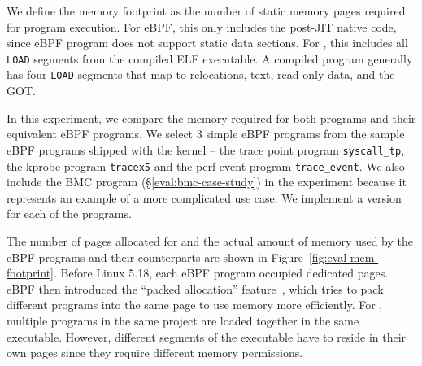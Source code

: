 We define the memory footprint as the number of static memory pages required
    for program execution.
For eBPF, this only includes the post-JIT native code, since eBPF program does
    not support static data sections.
For \projname{}, this includes all \texttt{LOAD} segments from the compiled ELF
    executable.
A compiled \projname{} program generally has four \texttt{LOAD} segments that
    map to relocations, text, read-only data, and the GOT.

In this experiment, we compare the memory required for both
    \projname{} programs and their equivalent eBPF programs.
We select 3 simple eBPF programs from the sample eBPF programs shipped with the
    kernel -- the trace point program \texttt{syscall\_tp}, the kprobe program
    \texttt{tracex5} and the perf event program \texttt{trace\_event}.
We also include the BMC program (\S\ref{eval:bmc-case-study}) in the
    experiment because it represents an example of a more complicated use case.
We implement a \projname{} version for each of the programs.

The number of pages allocated for and the actual amount of memory used by the
    eBPF programs and their \projname{} counterparts are shown in
    Figure~\ref{fig:eval-mem-footprint}.
Before Linux 5.18, each eBPF program occupied dedicated pages.
eBPF then introduced the ``packed allocation''
    feature~\cite{bpf-packed-alloc}, which
    tries to pack different programs into the same page to use memory more
    efficiently.
For \projname{}, multiple programs in the same project are
    loaded together in the same executable.
However, different segments of the executable have to reside in their own
    pages since they require different memory permissions.

